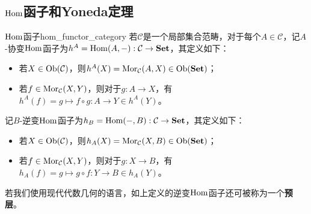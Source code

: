 \documentclass[../main.tex]{subfiles}
\begin{document}
\subsection{$\operatorname{Hom}$函子和Yoneda定理}
\begin{definition}{$\operatorname{Hom}$函子}{hom_functor_category}
若$\mathcal{C}$是一个局部集合范畴，对于每个$A\in\mathcal{C}$，记$A$-协变$\operatorname{Hom}$函子为$h^A=\operatorname{Hom}(A,-):\mathcal{C}\to\mathbf{Set}$，其定义如下：
\begin{itemize}
\item 若$X\in\operatorname{Ob}(\mathcal{C})$，则$h^A(X)=\operatorname{Mor}_\mathcal{C}(A,X)\in\operatorname{Ob}(\mathbf{Set})$；
\item 若$f\in\operatorname{Mor}_\mathcal{C}(X,Y)$，则对于$g:A\to X$，有$h^A(f)=g\mapsto f\circ g:A\to Y\in h^A(Y)$。
\end{itemize}

记$B$-逆变$\operatorname{Hom}$函子为$h_B=\operatorname{Hom}(-,B):\mathcal{C}\to\mathbf{Set}$，其定义如下：
\begin{itemize}
\item 若$X\in\operatorname{Ob}(\mathcal{C})$，则$h_A(X)=\operatorname{Mor}_\mathcal{C}(X,B)\in\operatorname{Ob}(\mathbf{Set})$；
\item 若$f\in\operatorname{Mor}_\mathcal{C}(X,Y)$，则对于$g:X\to B$，有$h_A(f)=g\mapsto g\circ f:Y\to B\in h_A(Y)$。
\end{itemize}
\end{definition}
若我们使用现代代数几何的语言，如上定义的逆变$\operatorname{Hom}$函子还可被称为一个\textbf{预层}。
\end{document}
